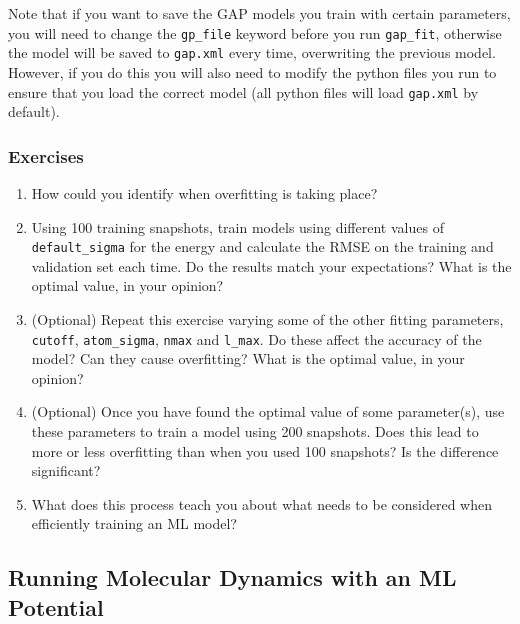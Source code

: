 \documentclass{article}
\begin{document}
Note that if you want to save the GAP models you train with certain parameters, you will need to change the \verb|gp_file| keyword before you run \verb|gap_fit|, otherwise the model will be saved to \verb|gap.xml| every time, overwriting the previous model. However, if you do this you will also need to modify the python files you run to ensure that you load the correct model (all python files will load \verb|gap.xml| by default).

\subsubsection*{Exercises}

\begin{enumerate}
\item How could you identify when overfitting is taking place?
\item Using 100 training snapshots, train models using different values of \verb|default_sigma| for the energy and calculate the RMSE on the training and validation set each time. Do the results match your expectations? What is the optimal value, in your opinion?
\item (Optional) Repeat this exercise varying some of the other fitting parameters, \verb|cutoff|, \verb|atom_sigma|, \verb|nmax| and \verb|l_max|. Do these affect the accuracy of the model? Can they cause overfitting? What is the optimal value, in your opinion?
\item (Optional) Once you have found the optimal value of some parameter(s), use these parameters to train a model using 200 snapshots. Does this lead to more or less overfitting than when you used 100 snapshots? Is the difference significant?
\item What does this process teach you about what needs to be considered when efficiently training an ML model?

\end{enumerate}



\subsection{Running Molecular Dynamics with an ML Potential}
\label{sec:md}
\end{document}
